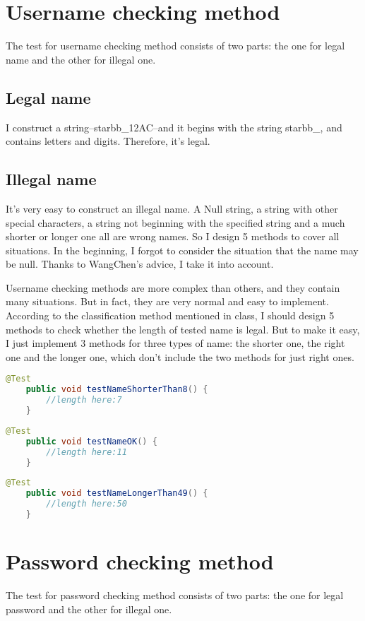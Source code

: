 \documentclass[a4paper]{report}
\begin{document}
\section{Username checking method}
\par The test for username checking method consists of two parts: the one for legal name and the other for illegal one.
\subsection{Legal name}
\par I construct a string--starbb\_12AC--and it begins with the string starbb\_, and contains letters and digits. Therefore, it's legal.
\subsection{Illegal name}
\par It's very easy to construct an illegal name. A Null string, a string with other special characters, a string not beginning with the specified string and a much shorter or longer one all are wrong names. So I design 5 methods to cover all situations. In the beginning, I forgot to consider the situation that the name may be null. Thanks to WangChen's advice, I take it into account.
\par Username checking methods are more complex than others, and they contain many situations. But in fact, they are very normal and easy to implement. According to the classification method mentioned in class, I should design 5 methods to check whether the length of tested name is legal. But to make it easy, I just implement 3 methods for three types of name: the shorter one, the right one and the longer one, which don't include the two methods for just right ones.
\begin{lstlisting}[language=java]
    @Test
    public void testNameShorterThan8() {
        //length here:7
    }
\end{lstlisting}
\begin{lstlisting}[language=java]
    @Test
    public void testNameOK() {
        //length here:11
    }
\end{lstlisting}
\begin{lstlisting}[language=java]
    @Test
    public void testNameLongerThan49() {
        //length here:50
    }
\end{lstlisting}
\section{Password checking method}
\par The test for password checking method consists of two parts: the one for legal password and the other for illegal one.
\end{document}
